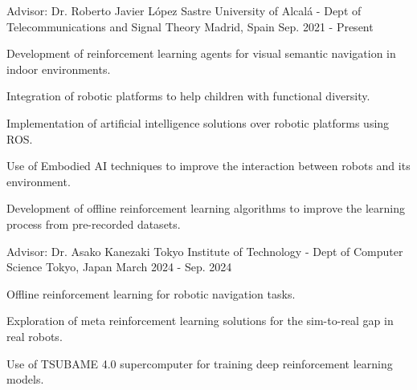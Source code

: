 

\begin{cventries}

    \cventry
    {Advisor: Dr. Roberto Javier López Sastre} %
    {University of Alcalá - Dept of Telecommunications and Signal Theory} %
    {Madrid, Spain} %
    {Sep. 2021 - Present} %
    {
        \begin{cvitems} %
            \item {Development of reinforcement learning agents for visual semantic navigation in indoor environments.}
            \item {Integration of robotic platforms to help children with functional diversity.}
            \item {Implementation of artificial intelligence solutions over robotic platforms using ROS.}
            \item {Use of Embodied AI techniques to improve the interaction between robots and its environment.}
            \item {Development of offline reinforcement learning algorithms to improve the learning process from pre-recorded datasets.}
        \end{cvitems}
    }

    \cventry
    {Advisor: Dr. Asako Kanezaki} %
    {Tokyo Institute of Technology - Dept of Computer Science} %
    {Tokyo, Japan} %
    {March 2024 - Sep. 2024} %
    {
        \begin{cvitems} %
            \item {Offline reinforcement learning for robotic navigation tasks.}
            \item {Exploration of meta reinforcement learning solutions for the sim-to-real gap in real robots.}
            \item {Use of TSUBAME 4.0 supercomputer for training deep reinforcement learning models.}
        \end{cvitems}
    }


\end{cventries}
